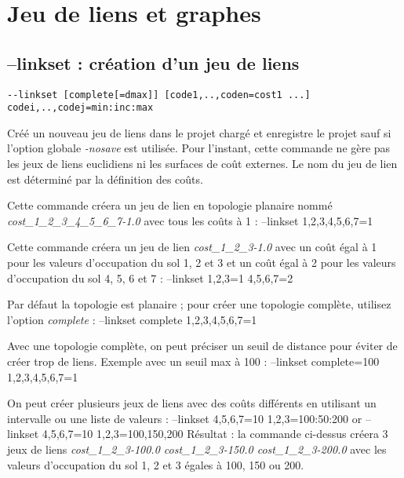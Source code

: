 \documentclass[a4paper,10pt]{report}
\newenvironment{cmd}
{\quote\Verbatim}
{\endVerbatim\endquote}
\begin{document}
\section{Jeu de liens et graphes}

\subsection{--linkset : création d'un jeu de liens}
\begin{verbatim}
--linkset [complete[=dmax]] [code1,..,coden=cost1 ...] codei,..,codej=min:inc:max
\end{verbatim}
Créé un nouveau jeu de liens dans le projet chargé et enregistre le projet sauf si l'option globale \textit{-nosave} est utilisée.
Pour l'instant, cette commande ne gère pas les jeux de liens euclidiens ni les surfaces de coût externes.
Le nom du jeu de lien est déterminé par la définition des coûts.

Cette commande créera un jeu de lien en topologie planaire nommé \textit{cost\_1\_2\_3\_4\_5\_6\_7-1.0} avec tous les coûts à 1 :
\begin{cmd}
--linkset 1,2,3,4,5,6,7=1
\end{cmd}

Cette commande créera un jeu de lien \textit{cost\_1\_2\_3-1.0} avec un coût égal à 1 pour les valeurs d'occupation du sol 1, 2 et 3 et un coût égal à 2 pour les valeurs d'occupation du sol 4, 5, 6 et 7 :
\begin{cmd}
--linkset 1,2,3=1 4,5,6,7=2
\end{cmd}

Par défaut la topologie est planaire ; pour créer une topologie complète, utilisez l'option \textit{complete} :
\begin{cmd}
--linkset complete 1,2,3,4,5,6,7=1
\end{cmd}

Avec une topologie complète, on peut préciser un seuil de distance pour éviter de créer trop de liens. Exemple avec un seuil max à 100 :
\begin{cmd}
--linkset complete=100 1,2,3,4,5,6,7=1
\end{cmd}

On peut créer plusieurs jeux de liens avec des coûts différents en utilisant un intervalle ou une liste de valeurs :
\begin{cmd}
--linkset 4,5,6,7=10 1,2,3=100:50:200
or
--linkset 4,5,6,7=10 1,2,3=100,150,200
\end{cmd}
Résultat : la commande ci-dessus créera 3 jeux de liens \textit{cost\_1\_2\_3-100.0 cost\_1\_2\_3-150.0 cost\_1\_2\_3-200.0}
avec les valeurs d'occupation du sol 1, 2 et 3 égales à 100, 150 ou 200.
\end{document}
